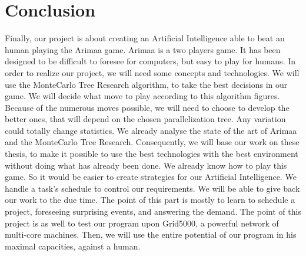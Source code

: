 \documentclass[12pt]{article}
\begin{document}
\section{Conclusion}
Finally, our project is about creating an Artificial Intelligence able to beat an human playing the Arimaa game.
\newline
\newline
Arimaa is a two players game. It has been designed to be difficult to foresee for computers, but easy to play for humans. 
In order to realize our project, we will need some concepts and technologies. 
We will use the MonteCarlo Tree Research algorithm, to take the best decisions\cite{cc} in our game. We will decide what move to play according to this algorithm figures. Because of the numerous moves possible, we will need to choose to develop the better ones, that will depend on the chosen parallelization tree. Any variation could totally change statistics.
We already analyse the state of the art of Arimaa and the MonteCarlo Tree Research. Consequently, we will base our work on these thesis, to make it possible to use the best technologies with the best environment without doing what has already been done.
We already know how to play this game. So it would be easier to create strategies for our Artificial Intelligence. We handle a task's schedule to control our requirements. We will be able to give back our work to the due time. The point of this part is mostly to learn to schedule a project, foreseeing surprising events, and answering the demand.
\smallbreak
The point of this project is as well to test our program upon Grid5000, a powerful network of multi-core machines. Then, we will use the entire potential of our program in his maximal capacities, against a human.



\end{document}

